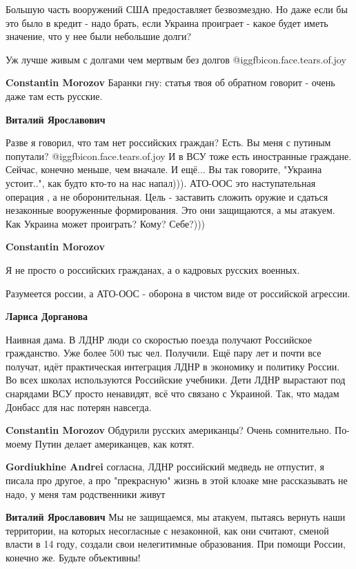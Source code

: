 \begin{itemize}
\begin{itemize}
Большую часть вооружений США предоставляет безвозмездно. Но даже если бы это
было в кредит - надо брать, если Украина проиграет - какое будет иметь
значение, что у нее были небольшие долги?

Уж лучше живым с долгами чем мертвым без долгов  @igg{fbicon.face.tears.of.joy} 

\textbf{Constantin Morozov} Баранки гну: статья твоя об обратном говорит - очень даже там есть русские.

\textbf{Виталий Ярославович} 

Разве я говорил, что там нет российских граждан? Есть. Вы меня с путиным
попутали?  @igg{fbicon.face.tears.of.joy}  И в ВСУ тоже есть иностранные граждане. Сейчас, конечно меньше,
чем вначале. И ещё... Вы так говорите, "Украина устоит..", как будто кто-то на
нас напал))). АТО-ООС это наступательная операция , а не оборонительная. Цель -
заставить сложить оружие и сдаться незаконные вооруженные формирования. Это они
защищаются, а мы атакуем. Как Украина может проиграть? Кому? Себе?)))

\textbf{Constantin Morozov} 

Я не просто о российских гражданах, а о кадровых русских военных.

Разумеется россии, а АТО-ООС - оборона в чистом виде от российской агрессии.


\textbf{Лариса Дорганова} 

Наивная дама. В ЛДНР люди со скоростью поезда получают Российское гражданство.
Уже более 500 тыс чел. Получили. Ещё пару лет и почти все получат, идёт
практическая интеграция ЛДНР в экономику и политику России. Во всех школах
используются Российские учебники. Дети ЛДНР вырастают под снарядами ВСУ просто
ненавидят, всё что связано с Украиной. Так, что мадам Донбасс для нас потерян
навсегда.

\textbf{Constantin Morozov} Обдурили русских американцы? Очень сомнительно. По-моему Путин делает американцев, как котят.

\textbf{Gordiukhine Andrei} согласна, ЛДНР российский медведь не отпустит, я писала про другое, а про "прекрасную" жизнь в этой клоаке мне рассказывать не надо, у меня там родственники живут

\textbf{Виталий Ярославович} Мы не защищаемся, мы атакуем, пытаясь вернуть наши территории, на которых несогласные с незаконной, как они считают, сменой власти в 14 году, создали свои нелегитимные образования. При помощи России, конечно же. Будьте объективны!


\end{itemize}
\end{itemize}
